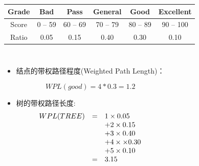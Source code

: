 \begin{frame}

  \begin{tabular}{|c|c|c|c|c|c|}
    \hline
    Grade & Bad & Pass & General & Good & Excellent \\ \hline
    Score & 0 -- 59 & 60 -- 69 & 70 -- 79 & 80 -- 89 & 90 -- 100 \\ \hline
    Ratio & 0.05 & 0.15 & 0.40 & 0.30 & 0.10 \\ \hline
  \end{tabular}

  \begin{columns}[T]

    \begin{itemize}
    \item 结点的带权路径程度(Weighted Path Length)：

      \[WPL(good) = 4*0.3=1.2 \]
      
    \item 树的带权路径长度:
      \begin{equation*}
        \begin{array}{r c l}
          WPL(TREE) & = & 1 \times 0.05  \\
          & & + 2 \times 0.15 \\
          & & + 3 \times 0.40 \\
          & & + 4 \times \times 0.30 \\
          & & + 5 \times 0.10 \\
          & = & 3.15 \\
        \end{array}
      \end{equation*}
    \end{itemize}
  \end{columns}
\end{frame}

